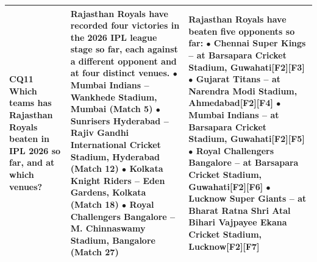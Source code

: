 \begin{longtable}{p{1.9cm}p{6.8cm}p{6.8cm}}
\textbf{CQ11} \newline \scriptsize Which teams has Rajasthan Royals beaten in IPL 2026 so far, and at which venues? & \scriptsize Rajasthan Royals have recorded four victories in the 2026 IPL league stage so far, each against a different opponent and at four distinct venues. \newline \quad$\bullet$ Mumbai Indians -- Wankhede Stadium, Mumbai (Match 5) \newline \quad$\bullet$ Sunrisers Hyderabad -- Rajiv Gandhi International Cricket Stadium, Hyderabad (Match 12) \newline \quad$\bullet$ Kolkata Knight Riders -- Eden Gardens, Kolkata (Match 18) \newline \quad$\bullet$ Royal Challengers Bangalore -- M. Chinnaswamy Stadium, Bangalore (Match 27) & \scriptsize Rajasthan Royals have beaten five opponents so far: \newline \quad$\bullet$ Chennai Super Kings -- at Barsapara Cricket Stadium, Guwahati\textsf{[F2]}\textsf{[F3]} \newline \quad$\bullet$ Gujarat Titans -- at Narendra Modi Stadium, Ahmedabad\textsf{[F2]}\textsf{[F4]} \newline \quad$\bullet$ Mumbai Indians -- at Barsapara Cricket Stadium, Guwahati\textsf{[F2]}\textsf{[F5]} \newline \quad$\bullet$ Royal Challengers Bangalore -- at Barsapara Cricket Stadium, Guwahati\textsf{[F2]}\textsf{[F6]} \newline \quad$\bullet$ Lucknow Super Giants -- at Bharat Ratna Shri Atal Bihari Vajpayee Ekana Cricket Stadium, Lucknow\textsf{[F2]}\textsf{[F7]} \\ \midrule

\end{longtable}

